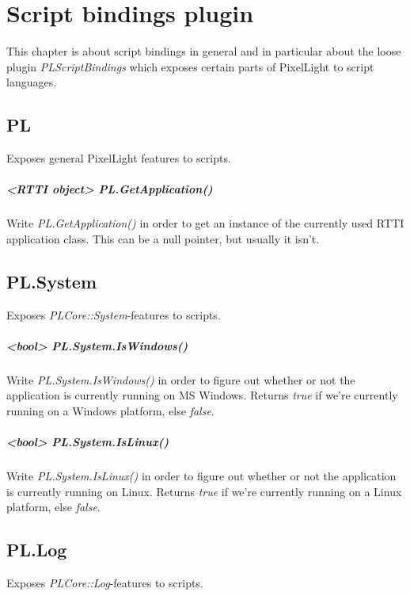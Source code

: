 \chapter{Script bindings plugin}
\label{ScriptBindingsPlugin}
This chapter is about script bindings in general and in particular about the loose plugin \emph{PLScriptBindings} which exposes certain parts of PixelLight to script languages.




\section{PL}
Exposes general PixelLight features to scripts.

\paragraph{<RTTI object> PL.GetApplication()}
Write \emph{PL.GetApplication()} in order to get an instance of the currently used RTTI application class. This can be a null pointer, but usually it isn't.




\section{PL.System}
Exposes \emph{PLCore::System}-features to scripts.

\paragraph{<bool> PL.System.IsWindows()}
Write \emph{PL.System.IsWindows()} in order to figure out whether or not the application is currently running on MS Windows. Returns \emph{true} if we're currently running on a Windows platform, else \emph{false}.

\paragraph{<bool> PL.System.IsLinux()}
Write \emph{PL.System.IsLinux()} in order to figure out whether or not the application is currently running on Linux. Returns \emph{true} if we're currently running on a Linux platform, else \emph{false}.




\section{PL.Log}
Exposes \emph{PLCore::Log}-features to scripts.

